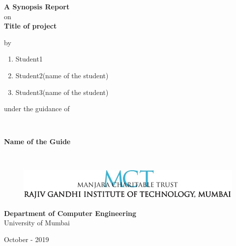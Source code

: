 \begin{titlepage}
\vspace*{0.025cm}
{\centering
\large
{\textbf {A Synopsis Report}}\\
on\\
\vspace{0.90cm}
{\Large\textbf {Title of project}} \\
\vspace{0.65cm}

by\\
\vspace{0.65cm}
\begin{enumerate}
\item \begin{center}Student1\end{center}
\item \begin{center}Student2(name of the student)\end{center}
\item \begin{center}Student3(name of the student)
\end{center}
\end{enumerate}

\vspace{2cm}
\begin{center}under the guidance of\end{center}\\
\vspace{0.3cm}
\hspace{.05cm} \begin{center}{\large \textbf {Name of the Guide }}\end{center}\\
\vspace{3cm}

\begin{figure}[h]
\centering
\includegraphics[scale=0.8]{college_logo.jpg}
\end{figure}
\hspace{.05cm}
\hspace{.05cm}
\vspace{0.0cm}
\begin{center}
\textbf {Department of Computer Engineering}\\
\vspace{0.35cm}
University of Mumbai\end{center}
\vspace{0.35cm}
\hspace{6.75cm}October - 2019}\\
\end{titlepage}
\newpage


